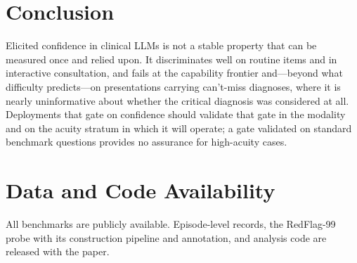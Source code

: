 \documentclass[journal,twoside]{IEEEtran}
\begin{document}
\section{Conclusion}
Elicited confidence in clinical LLMs is not a stable property that can be measured once and relied
upon. It discriminates well on routine items and in interactive consultation, and fails at the
capability frontier and---beyond what difficulty predicts---on presentations carrying can't-miss
diagnoses, where it is nearly uninformative about whether the critical diagnosis was considered at
all. Deployments that gate on confidence should validate that gate in the modality and on the acuity
stratum in which it will operate; a gate validated on standard benchmark questions provides no
assurance for high-acuity cases.

\section*{Data and Code Availability}
All benchmarks are publicly available. Episode-level records, the RedFlag-99 probe with its
construction pipeline and annotation, and analysis code are released with the paper.
\end{document}
